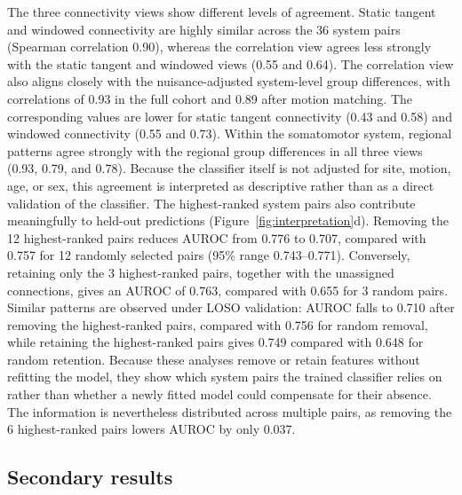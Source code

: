 The three connectivity views show different levels of agreement. Static tangent and windowed connectivity are highly similar across the 36 system pairs (Spearman correlation 0.90), whereas the correlation view agrees less strongly with the static tangent and windowed views (0.55 and 0.64). The correlation view also aligns closely with the nuisance-adjusted system-level group differences, with correlations of 0.93 in the full cohort and 0.89 after motion matching. The corresponding values are lower for static tangent connectivity (0.43 and 0.58) and windowed connectivity (0.55 and 0.73). Within the somatomotor system, regional patterns agree strongly with the regional group differences in all three views (0.93, 0.79, and 0.78). Because the classifier itself is not adjusted for site, motion, age, or sex, this agreement is interpreted as descriptive rather than as a direct validation of the classifier. The highest-ranked system pairs also contribute meaningfully to held-out predictions (Figure~\ref{fig:interpretation}d). Removing the 12 highest-ranked pairs reduces AUROC from 0.776 to 0.707, compared with 0.757 for 12 randomly selected pairs (95\% range 0.743--0.771). Conversely, retaining only the 3 highest-ranked pairs, together with the unassigned connections, gives an AUROC of 0.763, compared with 0.655 for 3 random pairs. Similar patterns are observed under LOSO validation: AUROC falls to 0.710 after removing the highest-ranked pairs, compared with 0.756 for random removal, while retaining the highest-ranked pairs gives 0.749 compared with 0.648 for random retention. Because these analyses remove or retain features without refitting the model, they show which system pairs the trained classifier relies on rather than whether a newly fitted model could compensate for their absence. The information is nevertheless distributed across multiple pairs, as removing the 6 highest-ranked pairs lowers AUROC by only 0.037.

\subsection{Secondary results}
\label{subsec:results-secondary}

